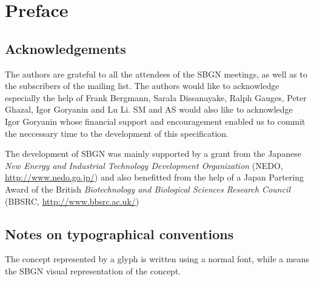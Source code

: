 
\chapter{Preface}

\section*{Acknowledgements}

The authors are grateful to all the attendees of the SBGN meetings, as well as to the subscribers of the  mailing list.  The authors would like to acknowledge especially the help of Frank Bergmann, Sarala Dissanayake, Ralph Gauges, Peter Ghazal, Igor Goryanin and Lu Li. SM and AS would also like to acknowledge Igor Goryanin whose financial support and encouragement enabled us to commit the neccessary time to the development of this specification.

The development of SBGN was mainly supported by a grant from the Japanese \emph{New Energy and Industrial Technology Development Organization} (NEDO, \url{http://www.nedo.go.jp/}) and also benefitted from the help of a Japan Partering Award of the British \emph{Biotechnology and Biological Sciences Research Council} (BBSRC, \url{http://www.bbsrc.ac.uk/})

\section*{Notes on typographical conventions}

The concept represented by a glyph is written using a normal font, while a  means the SBGN visual representation of the concept.



